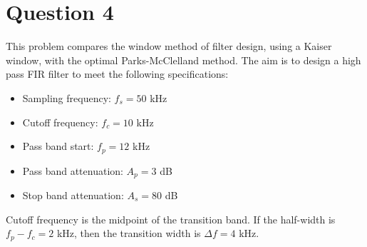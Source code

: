 \section*{Question 4}

This problem compares the window method of filter design, using a Kaiser window, with the optimal Parks-McClelland method. The aim is to design a high pass FIR filter to meet the following specifications:
\begin{multicols}{2}
    \begin{itemize}
        \item Sampling frequency: $f_s=50$ kHz
        \item Cutoff frequency: $f_c=10$ kHz
        \item Pass band start: $f_p=12$ kHz
        \item Pass band attenuation: $A_p=3$ dB
        \item Stop band attenuation: $A_s=80$ dB
    \end{itemize}
\end{multicols}
Cutoff frequency is the midpoint of the transition band. If the half-width is $f_p-f_c=2$ kHz, then the transition width is $\Delta f=4$ kHz.

